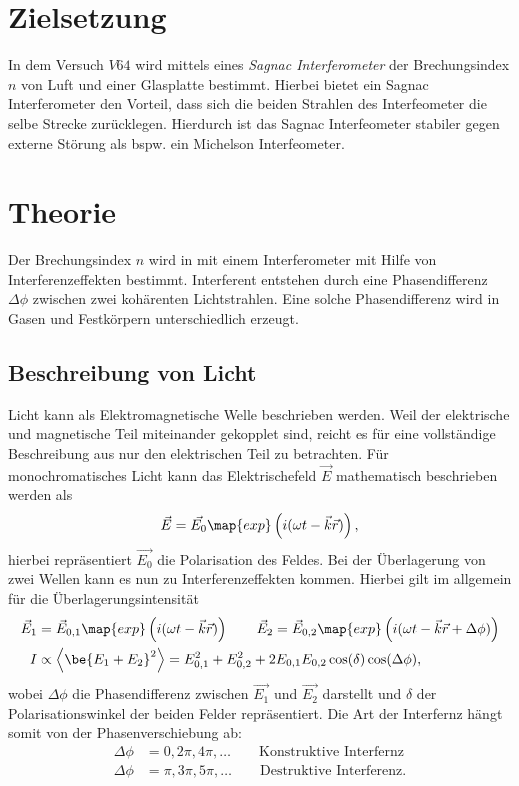 \setcounter{page}{1}
\section*{Zielsetzung}
In dem Versuch $V64$ wird mittels eines \emph{Sagnac Interferometer}
der Brechungsindex $n$ von Luft und einer Glasplatte bestimmt.
Hierbei bietet ein Sagnac Interferometer den Vorteil, dass sich
die beiden Strahlen des Interfeometer die selbe Strecke zurücklegen.
Hierdurch ist das Sagnac Interfeometer stabiler gegen externe Störung
als bspw. ein Michelson Interfeometer.

\section{Theorie}
Der Brechungsindex $n$ wird in mit einem Interferometer mit Hilfe von
Interferenzeffekten bestimmt. Interferent entstehen durch
eine Phasendifferenz $\Delta\phi$ zwischen zwei kohärenten Lichtstrahlen.
Eine solche Phasendifferenz wird in Gasen und Festkörpern unterschiedlich erzeugt.

\subsection{Beschreibung von Licht}

Licht kann als Elektromagnetische Welle beschrieben werden.
Weil der elektrische und magnetische Teil miteinander gekopplet sind, reicht
es für eine vollständige Beschreibung aus nur den elektrischen Teil zu betrachten.
Für monochromatisches Licht kann das Elektrischefeld $\vec{E}$ mathematisch beschrieben
werden als
\begin{equation*}
  \vec{E} = \vec{E_0} \map{exp}\left(i (\omega t-\vec{k}\vec{r})\right),
\end{equation*}
hierbei repräsentiert $\vec{E_0}$ die Polarisation des Feldes.
Bei der Überlagerung von zwei Wellen kann es nun zu Interferenzeffekten kommen.
Hierbei gilt im allgemein für die Überlagerungsintensität
\begin{align}
  \label{eq:Interferenz_enstehung}
  \begin{aligned}
  \vec{E}_1&=\vec{E}_{0,1} \map{exp}\left(i (\omega t-\vec{k}\vec{r})\right) \qquad \vec{E}_2 =\vec{E}_{0,2} \map{exp}\left(i (\omega t-\vec{k}\vec{r}+\Delta\phi)\right) \\
  I &\propto \left<\be{E_1+E_2}^2\right> = E_{0,1}^2 + E_{0,2}^2 + 2E_{0,1}E_{0,2}\cos(\delta)\cos(\Delta\phi),
\end{aligned}
\end{align}
wobei $\Delta\phi$ die Phasendifferenz zwischen $\vec{E_1}$ und $\vec{E_2}$ darstellt und
$\delta$ der Polarisationswinkel der beiden Felder repräsentiert.
Die Art der Interfernz hängt somit von der Phasenverschiebung ab:
\begin{align}
  \Delta\phi &=0,2\pi,4\pi,\dots \qquad \text{Konstruktive Interfernz} \label{eq:Konstruktive}\\
  \Delta\phi &= \pi, 3\pi, 5\pi,\dots \qquad \text{Destruktive Interferenz}. \label{eq:Destruktive}
\end{align}
